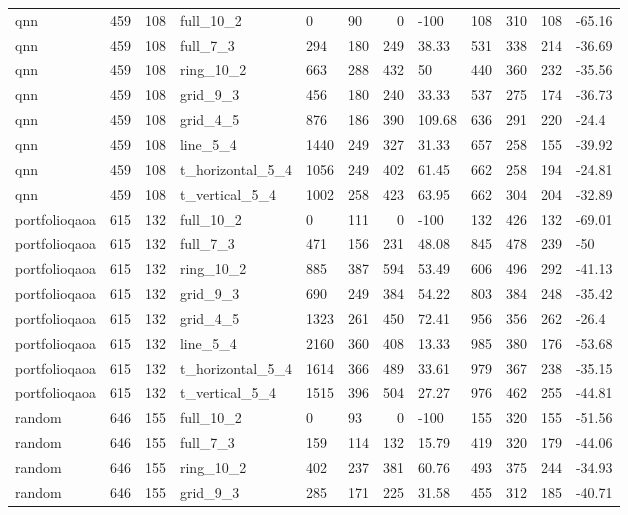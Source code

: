 \begin{longtable}{lrrlllrlllrl}
qnn & 459 & 108 & full\_10\_2 & 0 & 90 & 0 & -100 & 108 & 310 & 108 & -65.16 \\
qnn & 459 & 108 & full\_7\_3 & 294 & 180 & 249 & 38.33 & 531 & 338 & 214 & -36.69 \\
qnn & 459 & 108 & ring\_10\_2 & 663 & 288 & 432 & 50 & 440 & 360 & 232 & -35.56 \\
qnn & 459 & 108 & grid\_9\_3 & 456 & 180 & 240 & 33.33 & 537 & 275 & 174 & -36.73 \\
qnn & 459 & 108 & grid\_4\_5 & 876 & 186 & 390 & 109.68 & 636 & 291 & 220 & -24.4 \\
qnn & 459 & 108 & line\_5\_4 & 1440 & 249 & 327 & 31.33 & 657 & 258 & 155 & -39.92 \\
qnn & 459 & 108 & t\_horizontal\_5\_4 & 1056 & 249 & 402 & 61.45 & 662 & 258 & 194 & -24.81 \\
qnn & 459 & 108 & t\_vertical\_5\_4 & 1002 & 258 & 423 & 63.95 & 662 & 304 & 204 & -32.89 \\
portfolioqaoa & 615 & 132 & full\_10\_2 & 0 & 111 & 0 & -100 & 132 & 426 & 132 & -69.01 \\
portfolioqaoa & 615 & 132 & full\_7\_3 & 471 & 156 & 231 & 48.08 & 845 & 478 & 239 & -50 \\
portfolioqaoa & 615 & 132 & ring\_10\_2 & 885 & 387 & 594 & 53.49 & 606 & 496 & 292 & -41.13 \\
portfolioqaoa & 615 & 132 & grid\_9\_3 & 690 & 249 & 384 & 54.22 & 803 & 384 & 248 & -35.42 \\
portfolioqaoa & 615 & 132 & grid\_4\_5 & 1323 & 261 & 450 & 72.41 & 956 & 356 & 262 & -26.4 \\
portfolioqaoa & 615 & 132 & line\_5\_4 & 2160 & 360 & 408 & 13.33 & 985 & 380 & 176 & -53.68 \\
portfolioqaoa & 615 & 132 & t\_horizontal\_5\_4 & 1614 & 366 & 489 & 33.61 & 979 & 367 & 238 & -35.15 \\
portfolioqaoa & 615 & 132 & t\_vertical\_5\_4 & 1515 & 396 & 504 & 27.27 & 976 & 462 & 255 & -44.81 \\
random & 646 & 155 & full\_10\_2 & 0 & 93 & 0 & -100 & 155 & 320 & 155 & -51.56 \\
random & 646 & 155 & full\_7\_3 & 159 & 114 & 132 & 15.79 & 419 & 320 & 179 & -44.06 \\
random & 646 & 155 & ring\_10\_2 & 402 & 237 & 381 & 60.76 & 493 & 375 & 244 & -34.93 \\
random & 646 & 155 & grid\_9\_3 & 285 & 171 & 225 & 31.58 & 455 & 312 & 185 & -40.71 \\

\end{longtable}
